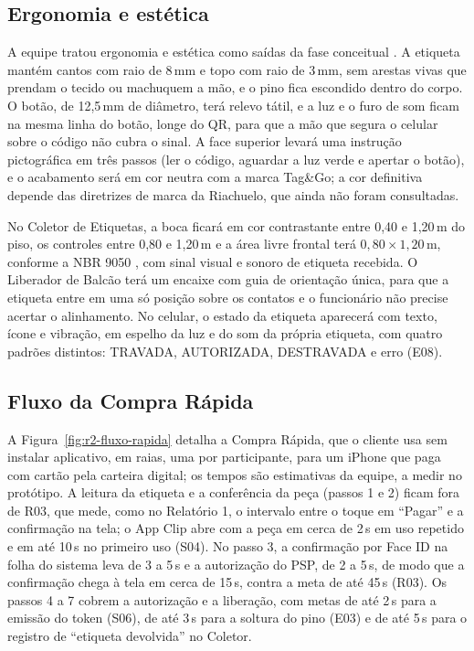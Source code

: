 \subsection{Ergonomia e estética}

A equipe tratou ergonomia e estética como saídas da fase conceitual \cite{zancul2026conceitual}. A etiqueta mantém cantos com raio de 8\,mm e topo com raio de 3\,mm, sem arestas vivas que prendam o tecido ou machuquem a mão, e o pino fica escondido dentro do corpo. O botão, de 12,5\,mm de diâmetro, terá relevo tátil, e a luz e o furo de som ficam na mesma linha do botão, longe do QR, para que a mão que segura o celular sobre o código não cubra o sinal. A face superior levará uma instrução pictográfica em três passos (ler o código, aguardar a luz verde e apertar o botão), e o acabamento será em cor neutra com a marca Tag\&Go; a cor definitiva depende das diretrizes de marca da Riachuelo, que ainda não foram consultadas.

No Coletor de Etiquetas, a boca ficará em cor contrastante entre 0,40 e 1,20\,m do piso, os controles entre 0,80 e 1,20\,m e a área livre frontal terá $0{,}80 \times 1{,}20$\,m, conforme a NBR 9050 \cite{abnt2020nbr9050}, com sinal visual e sonoro de etiqueta recebida. O Liberador de Balcão terá um encaixe com guia de orientação única, para que a etiqueta entre em uma só posição sobre os contatos e o funcionário não precise acertar o alinhamento. No celular, o estado da etiqueta aparecerá com texto, ícone e vibração, em espelho da luz e do som da própria etiqueta, com quatro padrões distintos: TRAVADA, AUTORIZADA, DESTRAVADA e erro (E08).

\subsection{Fluxo da Compra Rápida}

A Figura~\ref{fig:r2-fluxo-rapida} detalha a Compra Rápida, que o cliente usa sem instalar aplicativo, em raias, uma por participante, para um iPhone que paga com cartão pela carteira digital; os tempos são estimativas da equipe, a medir no protótipo. A leitura da etiqueta e a conferência da peça (passos 1 e 2) ficam fora de R03, que mede, como no Relatório 1, o intervalo entre o toque em ``Pagar'' e a confirmação na tela; o App Clip abre com a peça em cerca de 2\,s em uso repetido e em até 10\,s no primeiro uso (S04). No passo 3, a confirmação por Face ID na folha do sistema leva de 3 a 5\,s e a autorização do PSP, de 2 a 5\,s, de modo que a confirmação chega à tela em cerca de 15\,s, contra a meta de até 45\,s (R03). Os passos 4 a 7 cobrem a autorização e a liberação, com metas de até 2\,s para a emissão do token (S06), de até 3\,s para a soltura do pino (E03) e de até 5\,s para o registro de ``etiqueta devolvida'' no Coletor.

